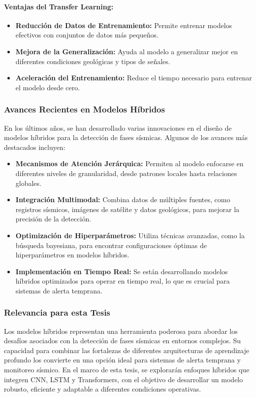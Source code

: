 \paragraph{Ventajas del Transfer Learning:}
\begin{itemize}
    \item \textbf{Reducción de Datos de Entrenamiento:} Permite entrenar modelos efectivos con conjuntos de datos más pequeños.
    \item \textbf{Mejora de la Generalización:} Ayuda al modelo a generalizar mejor en diferentes condiciones geológicas y tipos de señales.
    \item \textbf{Aceleración del Entrenamiento:} Reduce el tiempo necesario para entrenar el modelo desde cero.
\end{itemize}

\subsubsection{Avances Recientes en Modelos Híbridos}

En los últimos años, se han desarrollado varias innovaciones en el diseño de modelos híbridos para la detección de fases sísmicas. Algunos de los avances más destacados incluyen:

\begin{itemize}
    \item \textbf{Mecanismos de Atención Jerárquica:} Permiten al modelo enfocarse en diferentes niveles de granularidad, desde patrones locales hasta relaciones globales.
    \item \textbf{Integración Multimodal:} Combina datos de múltiples fuentes, como registros sísmicos, imágenes de satélite y datos geológicos, para mejorar la precisión de la detección.
    \item \textbf{Optimización de Hiperparámetros:} Utiliza técnicas avanzadas, como la búsqueda bayesiana, para encontrar configuraciones óptimas de hiperparámetros en modelos híbridos.
    \item \textbf{Implementación en Tiempo Real:} Se están desarrollando modelos híbridos optimizados para operar en tiempo real, lo que es crucial para sistemas de alerta temprana.
\end{itemize}

\subsubsection{Relevancia para esta Tesis}

Los modelos híbridos representan una herramienta poderosa para abordar los desafíos asociados con la detección de fases sísmicas en entornos complejos. Su capacidad para combinar las fortalezas de diferentes arquitecturas de aprendizaje profundo los convierte en una opción ideal para sistemas de alerta temprana y monitoreo sísmico. En el marco de esta tesis, se explorarán enfoques híbridos que integren CNN, LSTM y Transformers, con el objetivo de desarrollar un modelo robusto, eficiente y adaptable a diferentes condiciones operativas.